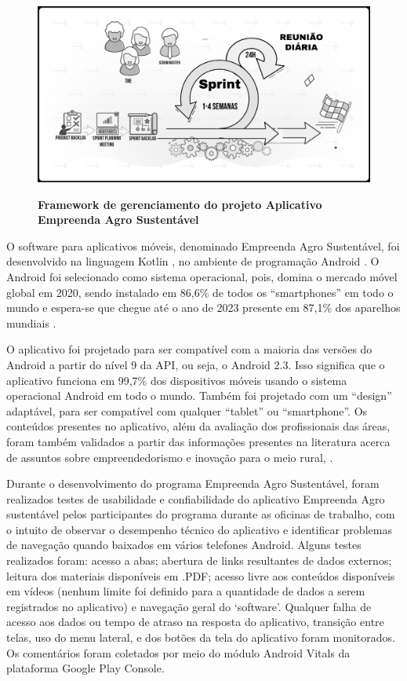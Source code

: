 \begin{figure}[H]
\centering
\caption{\textbf{Framework de gerenciamento do projeto Aplicativo Empreenda Agro Sustentável }}
\includegraphics[scale=0.1]{Imagens/scrum.png}
\label{figura_47}
\end{figure}

O software para aplicativos móveis, denominado Empreenda Agro Sustentável, foi desenvolvido na linguagem Kotlin \cite{smyth_kotlinandroid_2017}, no ambiente de programação Android \cite{android_conheco_2019}. O Android foi selecionado como sistema operacional, pois, domina o mercado móvel global em 2020, sendo instalado em 86,6\% de todos os “smartphones” em todo o mundo e espera-se que chegue até o ano de 2023 presente em 87,1\% dos aparelhos mundiais \cite{idc_idc_2020}.

O aplicativo foi projetado para ser compatível com a maioria das versões do Android a partir do nível 9 da API, ou seja, o Android 2.3. Isso significa que o aplicativo funciona em 99,7\% dos dispositivos móveis usando o sistema operacional Android em todo o mundo. Também foi projetado com um “design” adaptável, para ser compatível com qualquer “tablet” ou “smartphone”. Os conteúdos presentes no aplicativo, além da avaliação dos profissionais das áreas, foram também validados a partir das informações presentes na literatura acerca de assuntos sobre empreendedorismo e inovação para o meio rural, \cite{melo_sebrae_2008,oliveira_perfil_2006}.


Durante o desenvolvimento do programa Empreenda Agro Sustentável, foram realizados testes de usabilidade e confiabilidade do aplicativo Empreenda Agro sustentável pelos participantes do programa durante as oficinas de trabalho, com o intuito de observar o desempenho técnico do aplicativo e identificar problemas de navegação quando baixados em vários telefones Android. Alguns testes realizados foram: acesso a abas; abertura de links resultantes de dados externos; leitura dos materiais disponíveis em .PDF; acesso livre aos conteúdos disponíveis em vídeos (nenhum limite foi definido para a quantidade de dados a serem registrados no aplicativo) e navegação geral do ‘software’. Qualquer falha de acesso aos dados ou tempo de atraso na resposta do aplicativo, transição entre telas, uso do menu lateral, e dos botões da tela do aplicativo foram monitorados. Os comentários foram coletados por meio do módulo Android Vitals da plataforma Google Play Console.

